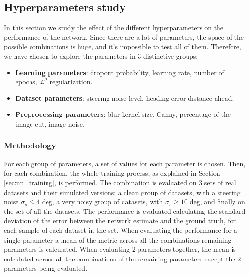 \documentclass[a4paper,12pt,sort&compress]{article}
\begin{document}
\clearpage

\subsection{Hyperparameters study}

    In this section we study the effect of the different hyperparameters on the performance of the
    network. Since there are a lot of parameters, the space of the possible combinations is huge, and
    it's impossible to test all of them. Therefore, we have chosen to explore the parameters in 3
    distinctive groups: 
    \begin{itemize}
        \item \textbf{Learning parameters}: dropout probability, learning rate, number of epochs,
        $\mathcal{L}^2$ regularization.
        \item \textbf{Dataset parameters}: steering noise level, heading error distance ahead.
        \item \textbf{Preprocessing parameters}: blur kernel size, Canny, percentage of the image cut, image noise.
    \end{itemize}

    \subsubsection*{Methodology}
    For each group of parameters, a set of values for each parameter is chosen. Then, for each
    combination, the whole training process, as explained in Section \ref{sec:nn_training}, is
    performed. The combination is evaluated on 3 sets of real datasets and their simulated versions: a clean group of datasets,
    with a steering noise $\sigma_s \leq 4$ deg, a very noisy group of datasets, with $\sigma_s \geq
    10$ deg, and finally on the set of all the datasets. The performance is evaluated calculating
    the standard deviation of the error between the network estimate and the ground truth, for each
    sample of each dataset in the set. When evaluating the performance for a single parameter a mean
    of the metric across all the combinations remaining parameters is calculated. When evaluating 2
    parameters together, the mean is calculated across all the combinations of the remaining
    parameters except the 2 parameters being evaluated. 
\end{document}
